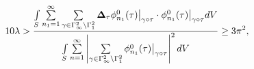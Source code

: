 \begin{equation}
10 \lambda >  
\frac{ \int\limits_{S}
\sum\limits^\infty_{n_{1}=1}
\sum\limits_{\gamma\in\Gamma^{2}_{\infty}\backslash\Gamma^{2}_{1}}
{\bf \Delta}_{\tau}\phi^0_{n_{1}}(\tau)\big|_{\gamma\circ\tau} 
\cdot \phi^0_{n_{1}}(\tau)\big|_{\gamma\circ\tau} dV}
{\int\limits_S\sum\limits^\infty_{n=1}
\left|\sum\limits_{\gamma\in\Gamma^{2}_{\infty}\backslash\Gamma^{2}_{1}}
\phi^0_{n_{1}}(\tau)\big|_{\gamma\circ\tau}\right|^2 dV} \geq 3\pi^{2},
\end{equation}

